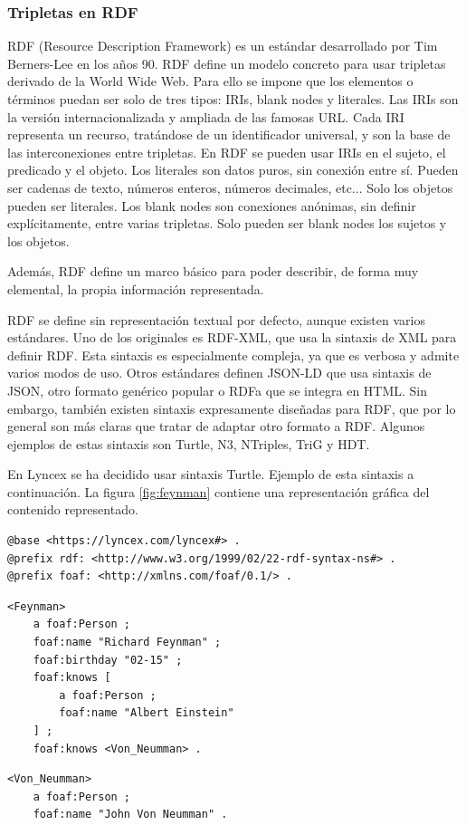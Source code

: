\documentclass[openright,twoside,12pt]{book}
\begin{document}
\subsubsection{Tripletas en RDF}

RDF (Resource Description Framework) es un estándar desarrollado por Tim Berners-Lee en los años 90.
RDF define un modelo concreto para usar tripletas derivado de la World Wide Web. Para ello se impone que los elementos o términos puedan ser solo de tres tipos: IRIs, blank nodes y literales.
Las IRIs son la versión internacionalizada y ampliada de las famosas URL. Cada IRI representa un recurso, tratándose de un identificador universal, y son la base de las interconexiones entre tripletas. En RDF se pueden usar IRIs en el sujeto, el predicado y el objeto.
Los literales son datos puros, sin conexión entre sí. Pueden ser cadenas de texto, números enteros, números decimales, etc... Solo los objetos pueden ser literales.
Los blank nodes son conexiones anónimas, sin definir explícitamente, entre varias tripletas. Solo pueden ser blank nodes los sujetos y los objetos.

Además, RDF define un marco básico para poder describir, de forma muy elemental, la propia información representada.

RDF se define sin representación textual por defecto, aunque existen varios estándares. Uno de los originales es RDF-XML\cite{rdfxml}, que usa la sintaxis de XML para definir RDF. Esta sintaxis es especialmente compleja, ya que es verbosa y admite varios modos de uso.
Otros estándares definen JSON-LD\cite{jsonld} que usa sintaxis de JSON, otro formato genérico popular o RDFa\cite{rdfa} que se integra en HTML. Sin embargo, también existen sintaxis expresamente diseñadas para RDF, que por lo general son más claras que tratar de adaptar otro formato a RDF.
Algunos ejemplos de estas sintaxis son Turtle\cite{turtle}, N3\cite{wiki:n3}, NTriples\cite{ntriples}, TriG\cite{trig} y HDT\cite{hdt}.

En Lyncex se ha decidido usar sintaxis Turtle. Ejemplo de esta sintaxis a continuación. La figura \ref{fig:feynman} contiene una representación gráfica del contenido representado.

\begin{lstlisting}
@base <https://lyncex.com/lyncex#> .
@prefix rdf: <http://www.w3.org/1999/02/22-rdf-syntax-ns#> .
@prefix foaf: <http://xmlns.com/foaf/0.1/> .
\end{lstlisting}
\begin{lstlisting}
<Feynman>
    a foaf:Person ;
    foaf:name "Richard Feynman" ;
    foaf:birthday "02-15" ;
    foaf:knows [
        a foaf:Person ;
        foaf:name "Albert Einstein"
    ] ;
    foaf:knows <Von_Neumman> .
\end{lstlisting}
\begin{lstlisting}
<Von_Neumman>
    a foaf:Person ;
    foaf:name "John Von Neumman" .
\end{lstlisting}
\end{document}
